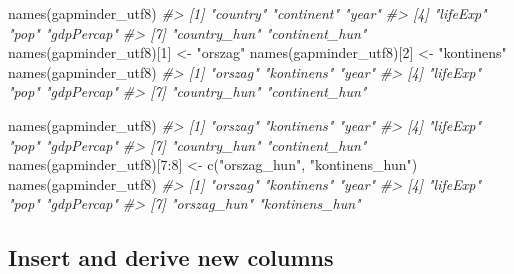 \documentclass[
]{book}
\newenvironment{Shaded}{\begin{snugshade}}{\end{snugshade}}
\newcommand{\CommentTok}[1]{\textcolor[rgb]{0.56,0.35,0.01}{\textit{#1}}}
\newcommand{\DecValTok}[1]{\textcolor[rgb]{0.00,0.00,0.81}{#1}}
\newcommand{\FunctionTok}[1]{\textcolor[rgb]{0.00,0.00,0.00}{#1}}
\newcommand{\NormalTok}[1]{#1}
\newcommand{\OtherTok}[1]{\textcolor[rgb]{0.56,0.35,0.01}{#1}}
\newcommand{\SpecialCharTok}[1]{\textcolor[rgb]{0.00,0.00,0.00}{#1}}
\newcommand{\StringTok}[1]{\textcolor[rgb]{0.31,0.60,0.02}{#1}}
\begin{document}
\begin{Shaded}
\begin{Highlighting}[]
\FunctionTok{names}\NormalTok{(gapminder\_utf8)}
\CommentTok{\#\textgreater{} [1] "country"       "continent"     "year"         }
\CommentTok{\#\textgreater{} [4] "lifeExp"       "pop"           "gdpPercap"    }
\CommentTok{\#\textgreater{} [7] "country\_hun"   "continent\_hun"}
\FunctionTok{names}\NormalTok{(gapminder\_utf8)[}\DecValTok{1}\NormalTok{] }\OtherTok{\textless{}{-}} \StringTok{"orszag"}
\FunctionTok{names}\NormalTok{(gapminder\_utf8)[}\DecValTok{2}\NormalTok{] }\OtherTok{\textless{}{-}} \StringTok{"kontinens"}
\FunctionTok{names}\NormalTok{(gapminder\_utf8)}
\CommentTok{\#\textgreater{} [1] "orszag"        "kontinens"     "year"         }
\CommentTok{\#\textgreater{} [4] "lifeExp"       "pop"           "gdpPercap"    }
\CommentTok{\#\textgreater{} [7] "country\_hun"   "continent\_hun"}

\FunctionTok{names}\NormalTok{(gapminder\_utf8)}
\CommentTok{\#\textgreater{} [1] "orszag"        "kontinens"     "year"         }
\CommentTok{\#\textgreater{} [4] "lifeExp"       "pop"           "gdpPercap"    }
\CommentTok{\#\textgreater{} [7] "country\_hun"   "continent\_hun"}
\FunctionTok{names}\NormalTok{(gapminder\_utf8)[}\DecValTok{7}\SpecialCharTok{:}\DecValTok{8}\NormalTok{] }\OtherTok{\textless{}{-}} \FunctionTok{c}\NormalTok{(}\StringTok{"orszag\_hun"}\NormalTok{, }\StringTok{"kontinens\_hun"}\NormalTok{)}
\FunctionTok{names}\NormalTok{(gapminder\_utf8)}
\CommentTok{\#\textgreater{} [1] "orszag"        "kontinens"     "year"         }
\CommentTok{\#\textgreater{} [4] "lifeExp"       "pop"           "gdpPercap"    }
\CommentTok{\#\textgreater{} [7] "orszag\_hun"    "kontinens\_hun"}
\end{Highlighting}
\end{Shaded}

\hypertarget{insert-and-derive-new-columns}{%
\subsection{Insert and derive new columns}\label{insert-and-derive-new-columns}}
\end{document}
